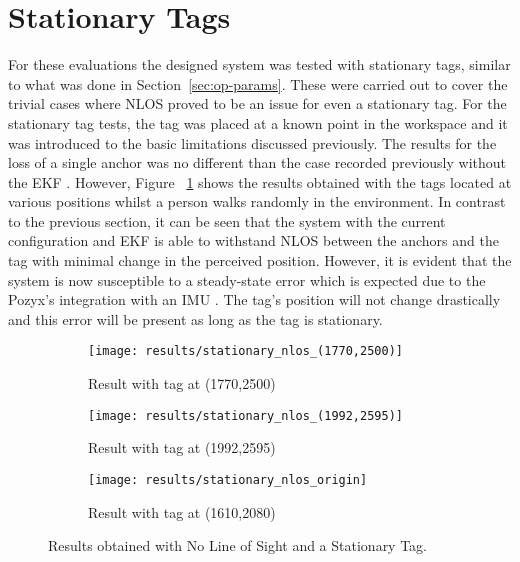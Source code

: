 \section{Stationary Tags}\label{sec:stationary-tags2}
For these evaluations the designed system was tested with stationary tags, similar to what was done in Section~\ref{sec:op-params}.
These were carried out to cover the trivial cases where NLOS proved to be an issue for even a stationary tag.
For the stationary tag tests, the tag was placed at a known point in the workspace and it was introduced to the basic limitations discussed previously.
The results for the loss of a single anchor was no different than the case recorded previously without the EKF .
However, Figure ~\ref{fig:stat_anchors} shows the results obtained with the tags located at various positions whilst a person walks randomly in the environment.
In contrast to the previous section, it can be seen that the system with the current configuration and EKF is able to withstand NLOS between the anchors and the tag with minimal change in the perceived position.
However, it is evident that the system is now susceptible to a steady-state error which is expected due to the Pozyx's integration with an IMU .
The tag's position will not change drastically and this error will be present as long as the tag is stationary.

\begin{figure}[h!]
    \centering
    \begin{subfigure}{0.49\textwidth}
            \texttt{[image: results/stationary\_nlos\_(1770,2500)]}
            \caption{Result with tag at (1770,2500)}
    \end{subfigure}
    \begin{subfigure}{0.49\textwidth}
            \texttt{[image: results/stationary\_nlos\_(1992,2595)]}
            \caption{Result with tag at (1992,2595)}
    \end{subfigure}
    \begin{subfigure}{0.5\textwidth}
            \texttt{[image: results/stationary\_nlos\_origin]}
            \caption{Result with tag at (1610,2080)}
    \end{subfigure}
    \caption{Results obtained with No Line of Sight and a Stationary Tag.}
    \label{fig:stat_anchors}
\end{figure}
\newpage

